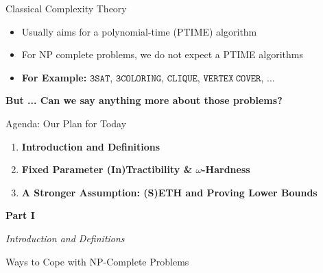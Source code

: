 \begin{frame}[c]{Classical Complexity Theory}
    \begin{itemize}   
        \item Usually aims for a polynomial-time (PTIME) algorithm
        \item For NP complete problems, we do not expect a PTIME algorithms
        \item \textbf{For Example: } $\mathtt{3SAT}$, $\mathtt{3COLORING}$, $\mathtt{CLIQUE}$, $\mathtt{VERTEX~COVER}$, ...
    \end{itemize}
    
    \begin{center}
    \textbf{But ... Can we say anything more about those problems?}
    \end{center}
\end{frame}


\begin{frame}[c]{Agenda: Our Plan for Today}
\begin{enumerate}
    \pause\item \textbf{Introduction and Definitions}
    \pause\item \textbf{Fixed Parameter (In)Tractibility \& $\omega$-Hardness}
    \pause\item \textbf{A Stronger Assumption: (S)ETH and Proving Lower Bounds}
\end{enumerate}
\end{frame}

\begin{frame}[c]{}
\begin{center}
    \textbf{Part I}
    
    \textit{Introduction and Definitions}
\end{center}
\end{frame}

\begin{frame}[c]{Ways to Cope with NP-Complete Problems}
\begin{center}

\end{center}
\end{frame}


